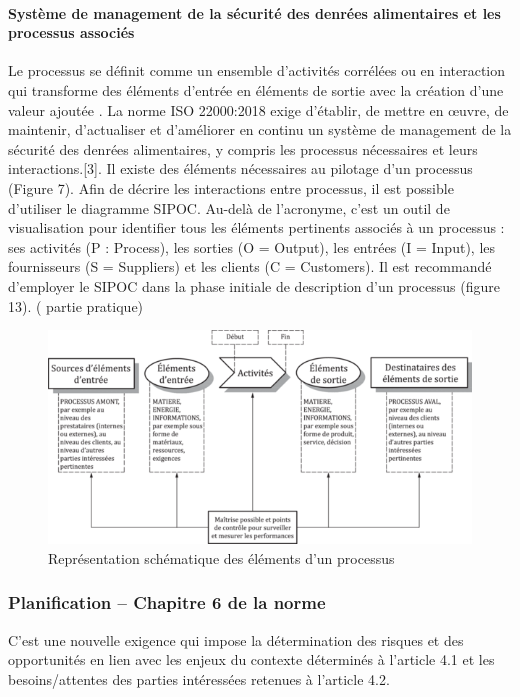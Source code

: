 \begin{spacing}{1.2}
\paragraph{Système de management de la sécurité des denrées alimentaires et les processus associés }

Le processus se définit comme un ensemble d’activités corrélées ou en interaction qui transforme des éléments d’entrée en éléments de sortie avec la création d’une valeur ajoutée .
La norme ISO 22000:2018 exige d’établir, de mettre en œuvre, de maintenir, d’actualiser et d’améliorer en continu un système de management de la sécurité des denrées alimentaires, y compris les processus nécessaires et leurs interactions.[3]. Il existe des éléments nécessaires au pilotage d’un processus (Figure 7). Afin de décrire les interactions entre processus, il est possible d’utiliser le diagramme SIPOC. Au-delà de l’acronyme, c’est un outil de visualisation pour identifier tous les éléments pertinents associés à un processus : ses activités (P : Process), les sorties (O = Output), les entrées (I = Input), les fournisseurs (S = Suppliers) et les clients (C = Customers). Il est recommandé d’employer le SIPOC dans la phase initiale de description d’un processus (figure 13). ( partie pratique)

\begin{figure}[!ht]\centering
\includegraphics[scale=9]{image6.png}
\caption{ Représentation schématique des éléments d’un processus }
\label{fig:fig1}
\end{figure}


\subsubsection{Planification – Chapitre 6 de la norme}

C’est une nouvelle exigence qui impose la détermination des risques et des opportunités en lien avec les enjeux du contexte déterminés à l’article 4.1 et les besoins/attentes des parties intéressées retenues à l’article 4.2.


\end{spacing}
